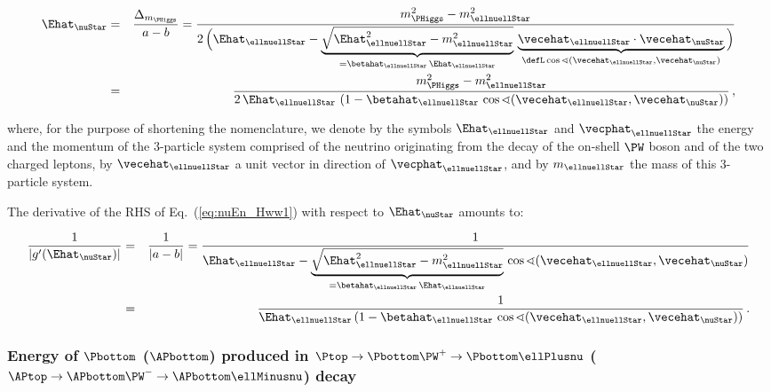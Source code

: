 \begin{linenowrapper}
\begin{eqnarray}
\Ehat_{\nuStar}
 & = & \frac{\Delta_{m_{\PHiggs}}}{a - b} 
 = \frac{m_{\PHiggs}^{2} - m_{\ellnuellStar}^{2}}{2 \, \Big( \Ehat_{\ellnuellStar}
- \underbrace{\sqrt{\Ehat_{\ellnuellStar}^{2} - m_{\ellnuellStar}^{2}}}_{= \betahat_{\ellnuellStar} \, \Ehat_{\ellnuellStar}} \,
 \underbrace{\vecehat_{\ellnuellStar} \cdot \vecehat_{\nuStar}}_{\defL \cos\sphericalangle(\vecehat_{\ellnuellStar},\vecehat_{\nuStar})} \Big)} \nonumber \\
 & = & \frac{m_{\PHiggs}^{2} - m_{\ellnuellStar}^{2}}{2 \, \Ehat_{\ellnuellStar} \, 
\left( 1 - \betahat_{\ellnuellStar} \, \cos\sphericalangle(\vecehat_{\ellnuellStar},\vecehat_{\nuStar}) \right)} \, ,
\label{eq:nuEn_Hww2}
\end{eqnarray}
\end{linenowrapper}
where, for the purpose of shortening the nomenclature, we denote by the symbols $\Ehat_{\ellnuellStar}$ and $\vecphat_{\ellnuellStar}$ the energy and the momentum
of the $3$-particle system comprised of the neutrino originating from the decay of the on-shell $\PW$ boson and of the two charged leptons,
by $\vecehat_{\ellnuellStar}$ a unit vector in direction of $\vecphat_{\ellnuellStar}$,
and by $m_{\ellnuellStar}$ the mass of this $3$-particle system.

The derivative of the RHS of Eq.~(\ref{eq:nuEn_Hww1}) with respect to $\Ehat_{\nuStar}$ amounts to:
\begin{linenowrapper}
\begin{eqnarray}
\frac{1}{|g^{\prime}(\Ehat_{\nuStar})|} 
 & = &\frac{1}{|a - b|} 
  = \frac{1}{\Ehat_{\ellnuellStar} - \underbrace{\sqrt{\Ehat_{\ellnuellStar}^{2} - m_{\ellnuellStar}^{2}}}_{= \betahat_{\ellnuellStar} \, \Ehat_{\ellnuellStar}} \, 
\cos\sphericalangle(\vecehat_{\ellnuellStar},\vecehat_{\nuStar})} \nonumber \\
 & = & \frac{1}{\Ehat_{\ellnuellStar} \left( 1 - \betahat_{\ellnuellStar} \, \cos\sphericalangle(\vecehat_{\ellnuellStar},\vecehat_{\nuStar}) \right)} \, .
\label{eq:nuEn_Hww3}
\end{eqnarray}
\end{linenowrapper}

\subsubsection{Energy of \texorpdfstring{$\Pbottom$}{b}  (\texorpdfstring{$\APbottom$}{bbar}) produced in \texorpdfstring{$\Ptop \to \Pbottom\PW^{+} \to \Pbottom\ellPlusnu$}{t->bW+->bl+v} (\texorpdfstring{$\APtop \to \APbottom\PW^{-} \to \APbottom\ellMinusnu$}{tbar->bbarW- ->bbarl-vbar}) decay}
\label{sec:appendix_bEn_top}

